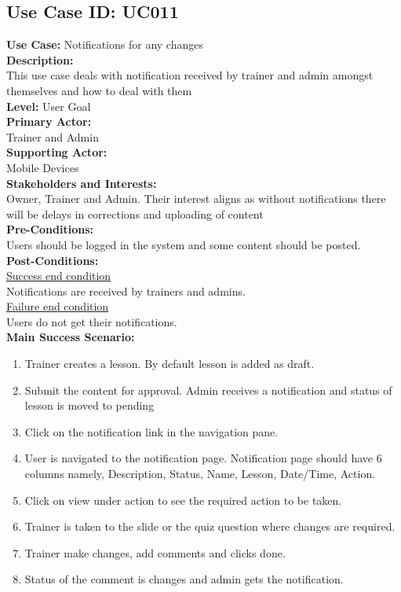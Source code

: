 \documentclass{report}
\begin{document}
\subsection{\textbf{Use Case ID:} UC011}
\textbf{Use Case:} Notifications for any changes\\[0.3cm]
\textbf{Description:}\\
This use case deals with notification received by trainer and admin amongst themselves and how to deal with them\\[0.3cm]
\textbf{Level:} User Goal\\[0.3cm]
\textbf{Primary Actor:}\\
Trainer and Admin\\[0.3cm]
\textbf{Supporting Actor:}\\
Mobile Devices\\[0.3cm]
\textbf{Stakeholders and Interests:}\\
Owner, Trainer and Admin. Their interest aligns as without notifications there will be delays in corrections and uploading of content\\[0.3cm]
\textbf{Pre-Conditions:}\\
Users should be logged in the system and some content should be posted.\\[0.3cm]
\textbf{Post-Conditions:}\\
\underline{Success end condition}\\
Notifications are received by trainers and admins.\\[0.3cm]
\underline{Failure end condition}\\
Users do not get their notifications.\\[0.3cm]
\textbf{\large {Main Success Scenario:}}
\begin{enumerate}
    \item Trainer creates a lesson. By default lesson is added as draft.
    \item Submit the content for approval. Admin receives a notification and status of lesson is moved to pending
    \item Click on the notification link in the navigation pane.
    \item User is navigated to the notification page. Notification page should have 6 columns namely, Description, Status, Name, Lesson, Date/Time, Action.
    \item Click on view under action to see the required action to be taken.
    \item Trainer is taken to the slide or the quiz question where changes are required.
    \item Trainer make changes, add comments and clicks done.
    \item Status of the comment is changes and admin gets the notification.
\end{enumerate}
\end{document}
